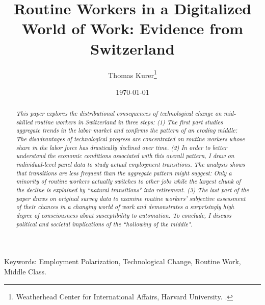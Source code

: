 \documentclass[smallheadings,12pt,a4paper, bibtotoc, abstracton, pointlessnumbers]{scrartcl}
\begin{document}
	
	
	\title{\Large{Routine Workers in a Digitalized World of Work: Evidence from Switzerland}}
	
	\author{\large
		Thomas Kurer\thanks{Weatherhead Center for International Affairs, Harvard University. .}
	}
	
	\date{\small{\today} \\ %
	}
	\maketitle
	\begin{abstract}
		\noindent
		{\em
This paper explores the distributional consequences of technological change on mid-skilled routine workers in Switzerland in three steps: (1) The first part studies aggregate trends in the labor market and confirms the pattern of an eroding middle: The disadvantages of technological progress are concentrated on routine workers whose share in the labor force has drastically declined over time. (2) In order to better understand the economic conditions associated with this overall pattern, I draw on individual-level panel data to study actual employment transitions. The analysis shows that transitions are less frequent than the aggregate pattern might suggest: Only a minority of routine workers actually switches to other jobs while the largest chunk of the decline is explained by ``natural transitions" into retirement. (3) The last part of the paper draws on original survey data to examine routine workers' subjective assessment of their chances in a changing world of work and demonstrates a surprisingly high degree of consciousness about susceptibility to automation. To conclude, I discuss political and societal implications of the ``hollowing of the middle".
		}

	\end{abstract}
\vspace{1cm}
Keywords: Employment Polarization, Technological Change, Routine Work, Middle Class.
	
	\thispagestyle{empty}
\end{document}
